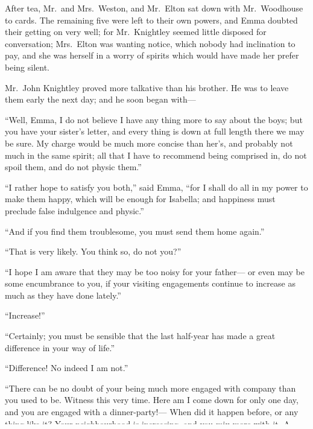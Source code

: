 After tea, Mr.\ and Mrs.\ Weston, and Mr.\ Elton sat down with Mr.\ Woodhouse
to cards.  The remaining five were left to their own powers,
and Emma doubted their getting on very well; for Mr.\ Knightley seemed
little disposed for conversation; Mrs.\ Elton was wanting notice,
which nobody had inclination to pay, and she was herself
in a worry of spirits which would have made her prefer being silent.

Mr.\ John Knightley proved more talkative than his brother.
He was to leave them early the next day; and he soon began with---%

``Well, Emma, I do not believe I have any thing more to say about
the boys; but you have your sister's letter, and every thing is
down at full length there we may be sure.  My charge would be much
more concise than her's, and probably not much in the same spirit;
all that I have to recommend being comprised in, do not spoil them,
and do not physic them.''

``I rather hope to satisfy you both,'' said Emma, ``for I shall do all
in my power to make them happy, which will be enough for Isabella;
and happiness must preclude false indulgence and physic.''

``And if you find them troublesome, you must send them home again.''

``That is very likely.  You think so, do not you?''

``I hope I am aware that they may be too noisy for your father---%
or even may be some encumbrance to you, if your visiting engagements
continue to increase as much as they have done lately.''

``Increase!''

``Certainly; you must be sensible that the last half-year has made
a great difference in your way of life.''

``Difference!  No indeed I am not.''

``There can be no doubt of your being much more engaged with company
than you used to be.  Witness this very time.  Here am I come
down for only one day, and you are engaged with a dinner-party!---%
When did it happen before, or any thing like it?  Your neighbourhood
is increasing, and you mix more with it.  A little while ago,
every letter to Isabella brought an account of fresh gaieties;
dinners at Mr.\ Cole's, or balls at the Crown.  The difference
which Randalls, Randalls alone makes in your goings-on, is very great.''

``Yes,'' said his brother quickly, ``it is Randalls that does it all.''

